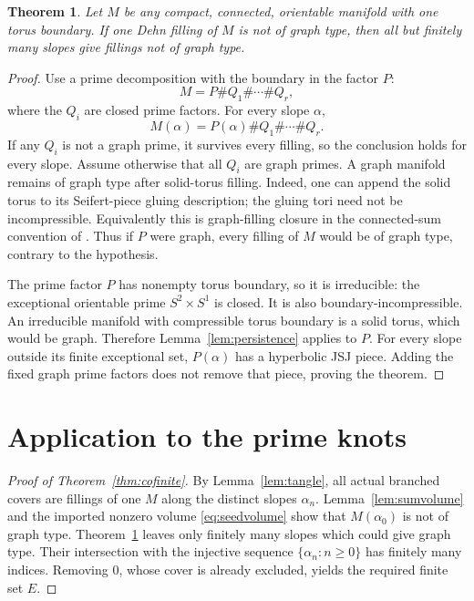 \documentclass[11pt]{article}
\newtheorem{theorem}{Theorem}
\begin{document}
\begin{theorem}\label{thm:onefilling}
Let $M$ be any compact, connected, orientable manifold with one torus
boundary. If one Dehn filling of $M$ is not of graph type, then all
but finitely many slopes give fillings not of graph type.
\end{theorem}
\begin{proof}
Use a prime decomposition with the boundary in the factor $P$:
\[
                     M=P\#Q_1\#\cdots\#Q_r,
\]
where the $Q_i$ are closed prime factors. For every slope $\alpha$,
\[
                 M(\alpha)=P(\alpha)\#Q_1\#\cdots\#Q_r.
\]
If any $Q_i$ is not a graph prime, it survives every filling, so the
conclusion holds for every slope. Assume otherwise that all $Q_i$
are graph primes. A graph manifold remains of graph type after
solid-torus filling. Indeed, one can append the solid torus to its
Seifert-piece gluing description; the gluing tori need not be
incompressible. Equivalently this is graph-filling closure in the
connected-sum convention of \cite[printed pp.~45 and~51]{bc}.
Thus if $P$ were graph, every filling of $M$ would be of graph type,
contrary to the hypothesis.

The prime factor $P$ has nonempty torus boundary, so it is
irreducible: the exceptional orientable prime $S^2\times S^1$ is
closed. It is also boundary-incompressible. An irreducible manifold
with compressible torus boundary is a solid torus, which would be
graph. Therefore Lemma~\ref{lem:persistence} applies to $P$.
For every slope outside its finite exceptional set, $P(\alpha)$ has
a hyperbolic JSJ piece. Adding the fixed graph prime factors does
not remove that piece, proving the theorem.
\end{proof}

\section{Application to the prime knots}

\begin{proof}[Proof of Theorem~\ref{thm:cofinite}]
By Lemma~\ref{lem:tangle}, all actual branched covers are fillings of
one $M$ along the distinct slopes $\alpha_n$.
Lemma~\ref{lem:sumvolume} and the imported nonzero volume
\eqref{eq:seedvolume} show that $M(\alpha_0)$ is not of graph type.
Theorem~\ref{thm:onefilling} leaves only finitely many slopes which
could give graph type. Their intersection with the injective sequence
$\{\alpha_n:n\ge0\}$ has finitely many indices. Removing $0$, whose
cover is already excluded, yields the required finite set $E$.
\end{proof}
\end{document}
